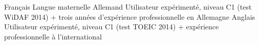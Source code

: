 

\begin{cvskills}

  \cvskill
    {Français} %
    {Langue maternelle} %
  \cvskill
	{Allemand} %
	{Utilisateur expérimenté, niveau C1 (test WiDAF 2014) + trois années d'expérience professionnelle en Allemagne} %
  \cvskill
	{Anglais} %
	{Utilisateur expérimenté, niveau C1 (test TOEIC 2014) + expérience professionnelle à l'international} %
\end{cvskills}

